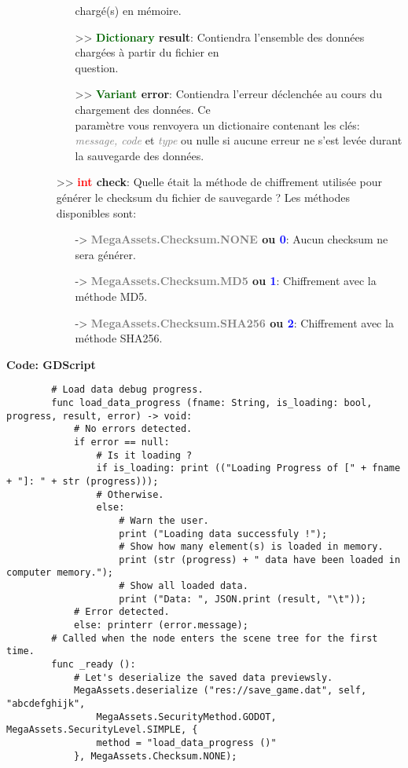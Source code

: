 \documentclass[a4paper, 11pt]{article}
\begin{document}
\begin{description}
\begin{itemize}
\begin{itemize}
				chargé(s) en mémoire.
				\item [>> \textbf{\textcolor{darkgreen}{Dictionary} result}:] Contiendra l'ensemble des
				données chargées à partir du fichier en \\question.
				\item [>> \textbf{\textcolor{darkgreen}{Variant} error}:] Contiendra l'erreur déclenchée au
				cours du chargement des données. Ce \\paramètre vous renvoyera un dictionaire contenant les
				clés: \textit{\textcolor{gray}{message, code}} et \textit{\textcolor{gray}{type}} ou nulle
				si aucune erreur ne s'est levée durant la sauvegarde des données.
			\end{itemize}
			\item [>> \textbf{\textcolor{red}{int} check}:] Quelle était la méthode de chiffrement utilisée
			pour générer le checksum du fichier de sauvegarde ? Les méthodes disponibles sont:
			\begin{itemize}
				\item [-> \textbf{\textcolor{gray}{MegaAssets.Checksum.NONE} ou \textcolor{blue}{0}}:] Aucun 
				checksum ne sera générer.
				\item [-> \textbf{\textcolor{gray}{MegaAssets.Checksum.MD5} ou \textcolor{blue}{1}}:] 
				Chiffrement avec la méthode MD5.
				\item [-> \textbf{\textcolor{gray}{MegaAssets.Checksum.SHA256} ou \textcolor{blue}{2}}:] 
				Chiffrement avec la méthode SHA256.\\
			\end{itemize}
		\end{itemize}
	\end{description}
	\textbf{Code: GDScript}
	\begin{lstlisting}
		# Load data debug progress.
		func load_data_progress (fname: String, is_loading: bool, progress, result, error) -> void:
			# No errors detected.
			if error == null:
				# Is it loading ?
				if is_loading: print (("Loading Progress of [" + fname + "]: " + str (progress)));
				# Otherwise.
				else:
					# Warn the user.
					print ("Loading data successfuly !");
					# Show how many element(s) is loaded in memory.
					print (str (progress) + " data have been loaded in computer memory.");
					# Show all loaded data.
					print ("Data: ", JSON.print (result, "\t"));
			# Error detected.
			else: printerr (error.message);
		# Called when the node enters the scene tree for the first time.
		func _ready ():
			# Let's deserialize the saved data previewsly.
			MegaAssets.deserialize ("res://save_game.dat", self, "abcdefghijk", 	
				MegaAssets.SecurityMethod.GODOT, MegaAssets.SecurityLevel.SIMPLE, {
				method = "load_data_progress ()"
			}, MegaAssets.Checksum.NONE);
	\end{lstlisting}
\end{document}
